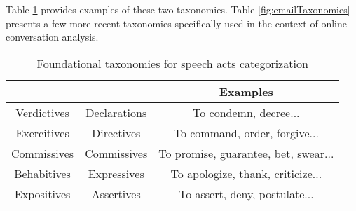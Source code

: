 Table \ref{fig:fundamentalTaxonomies} provides examples of these two taxonomies. Table \ref{fig:emailTaxonomies} presents a few more recent taxonomies specifically used in the context of online conversation analysis.

\begin{table}
	\begin{tabularx}{\textwidth}{c c c}
		\toprule
		\cite{austin1975things} & \cite{searle1976taxonomy} & Examples \\
		\midrule
		Verdictives & Declarations & To condemn, decree... \\
		Exercitives & Directives & To command, order, forgive... \\
		Commissives & Commissives & To promise, guarantee, bet, swear... \\
		Behabitives & Expressives & To apologize, thank, criticize... \\
		Expositives & Assertives & To assert, deny, postulate... \\
		\bottomrule
	\end{tabularx}
	\caption{Foundational taxonomies for speech acts categorization}
	\label{fig:fundamentalTaxonomies}
\end{table}

